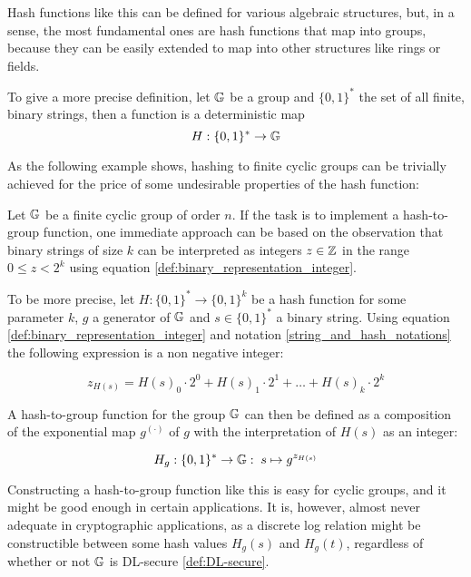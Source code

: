 Hash functions like this can be defined for various algebraic structures, but, in a sense, the most fundamental ones are hash functions that map into groups, because they can be easily extended to map into other structures like rings or fields.

To give a more precise definition, let $\mathbb{G}$ be a group and $\{0,1\}^*$ the set of all finite, binary strings, then a  function is a deterministic map
\begin{equation}
H : \{0,1\}^* \to \mathbb{G}
\end{equation}

As the following example shows, hashing to finite cyclic groups can be trivially achieved for the price of some undesirable properties of the hash function:
\begin{example}\label{naive-cyclic-group-hash} Let $\mathbb{G}$ be a finite cyclic group of order $n$. If the task is to implement a hash-to-group function, one immediate approach can be based on the observation that binary strings of size $k$ can be interpreted as integers $z\in\mathbb{Z}$ in the range $0\leq z < 2^k$ using equation \ref{def:binary_representation_integer}.

To be more precise, let $H:\{0,1\}^*\to \{0,1\}^k$ be a hash function for some parameter $k$, $g$ a generator of $\mathbb{G}$ and $s\in\{0,1\}^*$ a binary string. Using equation \ref{def:binary_representation_integer} and notation \ref{string_and_hash_notations} the following expression is a non negative integer:

\begin{equation}
z_{H(s)}= H(s)_0\cdot 2^0 + H(s)_1\cdot 2^1 + \ldots + H(s)_k \cdot 2^k
\end{equation}

A hash-to-group function for the group $\mathbb{G}$ can then be defined as a composition of the exponential map $g^{(\cdot)}$ of $g$ with the interpretation of $H(s)$ as an integer:

\begin{equation}
H_{g} : \{0,1\}^* \to \mathbb{G}:\; s \mapsto g^{z_{H(s)}}
\end{equation}

Constructing a hash-to-group function like this is easy for cyclic groups, and it might be good enough in certain applications. It is, however, almost never adequate in cryptographic applications, as a discrete log relation might be constructible between some hash values $H_g(s)$ and $H_g(t)$, regardless of whether or not $\mathbb{G}$ is DL-secure \ref{def:DL-secure}.


\end{example}
